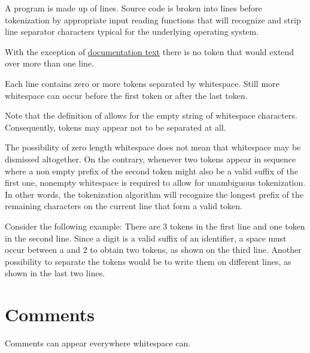 A program is made up of lines.
Source code is broken into lines before tokenization by appropriate
input reading functions that will recognize and strip line separator
characters typical for the underlying operating system. 

With the exception of \hyperref[doccomment]{documentation text} there is no token that would
extend over more than one line.

Each line contains zero or more tokens separated by whitespace. Still
more whitespace can occur before the first token or after the last
token.

Note that the definition of  allows for the empty
string of whitespace characters. Consequently, tokens may appear not to
be separated at all.

The possibility of zero length whitespace does not mean that whitespace
may be dismissed altogether. On the contrary, whenever two tokens appear
in sequence where a non empty prefix of the second token might also be a
valid suffix of the first one, nonempty whitespace is required to allow
for unambiguous tokenization. In other words, the tokenization algorithm
will recognize the longest prefix of the remaining characters on the
current line that form a valid token.

Consider the following example:
There are 3 tokens in the first line and one token in the second line.
Since a digit is a valid suffix of an identifier, a space must occur
between a and 2 to obtain two tokens, as shown on the third line.
Another possibility to separate the tokens would be to write them on
different lines, as shown in the last two lines.

\section{Comments} 

Comments can appear everywhere whitespace can.

\begin{flushleft}
  \oder{} \\
  \\
 \regex{)*-$\backslash$\}}\\
\end{flushleft}

